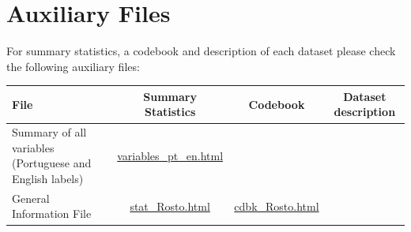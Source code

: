 \documentclass[]{book}
\begin{document}
\hypertarget{auxiliary-files}{%
\chapter{Auxiliary Files}\label{auxiliary-files}}

For summary statistics, a codebook and description of each dataset please check the following auxiliary files:

\begin{longtable}[]{@{}lccc@{}}
\toprule
\begin{minipage}[b]{0.19\columnwidth}\raggedright
File\strut
\end{minipage} & \begin{minipage}[b]{0.23\columnwidth}\centering
Summary Statistics\strut
\end{minipage} & \begin{minipage}[b]{0.23\columnwidth}\centering
Codebook\strut
\end{minipage} & \begin{minipage}[b]{0.23\columnwidth}\centering
Dataset description\strut
\end{minipage}\tabularnewline
\midrule
\endhead
\begin{minipage}[t]{0.19\columnwidth}\raggedright
Summary of all variables (Portuguese and English labels)\strut
\end{minipage} & \begin{minipage}[t]{0.23\columnwidth}\centering
\href{./Auxiliary\%20Files/variables_description/variables_pt_en.html}{variables\_pt\_en.html}\strut
\end{minipage} & \begin{minipage}[t]{0.23\columnwidth}\centering
\strut
\end{minipage} & \begin{minipage}[t]{0.23\columnwidth}\centering
\strut
\end{minipage}\tabularnewline
\begin{minipage}[t]{0.19\columnwidth}\raggedright
General Information File\strut
\end{minipage} & \begin{minipage}[t]{0.23\columnwidth}\centering
\href{./Auxiliary\%20Files/descriptive_statistics/stat_Rosto.html}{stat\_Rosto.html}\strut
\end{minipage} & \begin{minipage}[t]{0.23\columnwidth}\centering
\href{./Auxiliary\%20Files/codebook/cdbk_Rosto.html}{cdbk\_Rosto.html}\strut
\end{minipage} & \begin{minipage}[t]{0.23\columnwidth}\centering

\end{minipage}
\end{longtable}
\end{document}
